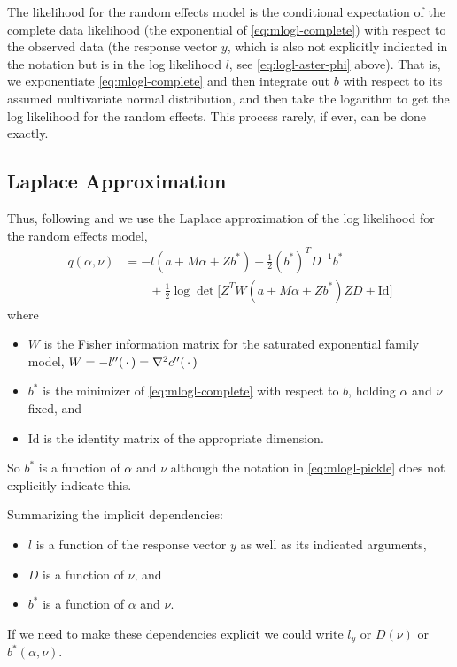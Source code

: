 The likelihood for the random effects model is the conditional expectation
of the complete data likelihood (the exponential of \eqref{eq:mlogl-complete})
with respect to the observed data (the response vector $y$, which is also
not explicitly indicated in the notation but is in the log likelihood $l$,
see \eqref{eq:logl-aster-phi} above).  That is, we exponentiate
\eqref{eq:mlogl-complete} and then integrate out $b$ with respect to its
assumed multivariate normal distribution, and then take the logarithm to get
the log likelihood for the random effects.  This process rarely, if ever,
can be done exactly.

\subsection{Laplace Approximation}

Thus, following \citet{breslow-clayton} and \citet{reaster}
we use the Laplace approximation
of the log likelihood for the random effects model,
\begin{equation} \label{eq:mlogl-pickle}
\begin{split}
   q(\alpha, \nu)
   & =
   - l(a + M \alpha + Z b^*) + \tfrac{1}{2} (b^*)^T D^{-1} b^*
   \\
   & \qquad
   + \tfrac{1}{2} \log \det \bigl[ Z^T W(a + M \alpha + Z b^*) Z D + \text{Id}
   \bigr]
\end{split}
\end{equation}
where
\begin{itemize}
\item $W$ is the Fisher information matrix for the saturated exponential
    family model, $W = - l''(\,\cdot\,) = \nabla^2 c''(\,\cdot\,)$
\item $b^*$ is the minimizer of \eqref{eq:mlogl-complete} with respect to $b$,
    holding $\alpha$ and $\nu$ fixed, and
\item $\text{Id}$ is the identity matrix of the appropriate dimension.
\end{itemize}
So $b^*$ is a function of $\alpha$ and $\nu$ although the notation in
\eqref{eq:mlogl-pickle} does not explicitly indicate this.

Summarizing the implicit dependencies:
\begin{itemize}
\item $l$ is a function of the response vector $y$ as well as its indicated
    arguments,
\item $D$ is a function of $\nu$, and
\item $b^*$ is a function of $\alpha$ and $\nu$.
\end{itemize}
If we need to make these dependencies explicit we could write $l_y$ or
$D(\nu)$ or $b^*(\alpha, \nu)$.

